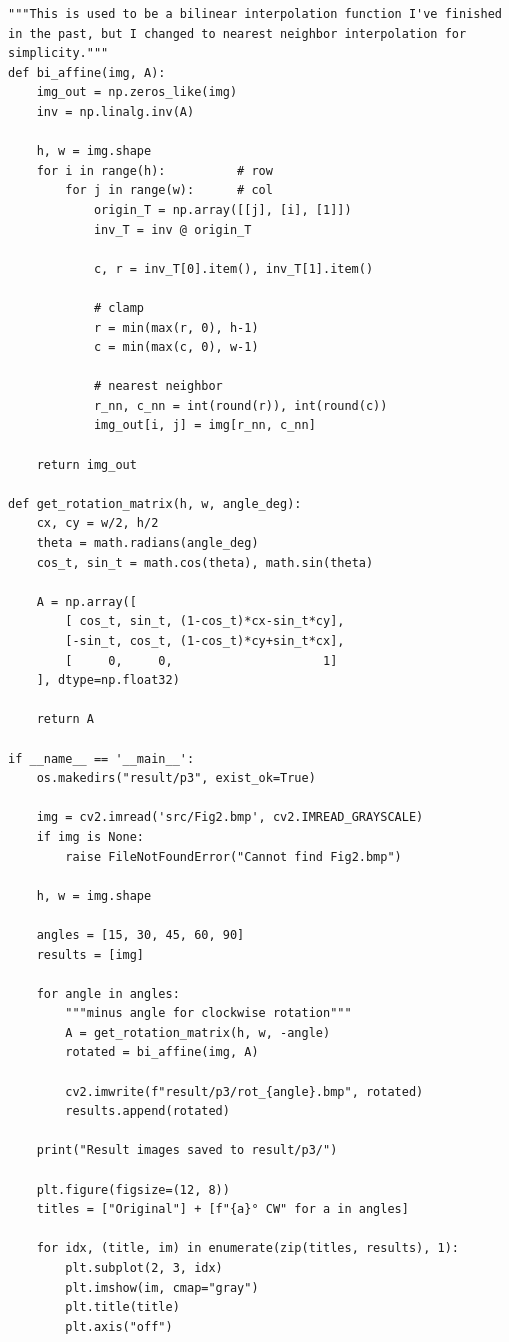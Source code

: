 \documentclass[12pt,a4paper]{article}
\begin{document}
\begin{enumerate}
\begin{verbatim}
"""This is used to be a bilinear interpolation function I've finished in the past, but I changed to nearest neighbor interpolation for simplicity."""
def bi_affine(img, A):
    img_out = np.zeros_like(img)
    inv = np.linalg.inv(A)

    h, w = img.shape
    for i in range(h):          # row
        for j in range(w):      # col
            origin_T = np.array([[j], [i], [1]])
            inv_T = inv @ origin_T

            c, r = inv_T[0].item(), inv_T[1].item()

            # clamp
            r = min(max(r, 0), h-1)
            c = min(max(c, 0), w-1)

            # nearest neighbor
            r_nn, c_nn = int(round(r)), int(round(c))
            img_out[i, j] = img[r_nn, c_nn]

    return img_out

def get_rotation_matrix(h, w, angle_deg):
    cx, cy = w/2, h/2
    theta = math.radians(angle_deg)
    cos_t, sin_t = math.cos(theta), math.sin(theta)

    A = np.array([
        [ cos_t, sin_t, (1-cos_t)*cx-sin_t*cy],
        [-sin_t, cos_t, (1-cos_t)*cy+sin_t*cx],
        [     0,     0,                     1]
    ], dtype=np.float32)

    return A

if __name__ == '__main__':
    os.makedirs("result/p3", exist_ok=True)

    img = cv2.imread('src/Fig2.bmp', cv2.IMREAD_GRAYSCALE)
    if img is None:
        raise FileNotFoundError("Cannot find Fig2.bmp")
    
    h, w = img.shape

    angles = [15, 30, 45, 60, 90]
    results = [img]

    for angle in angles:
        """minus angle for clockwise rotation"""
        A = get_rotation_matrix(h, w, -angle)
        rotated = bi_affine(img, A)

        cv2.imwrite(f"result/p3/rot_{angle}.bmp", rotated)
        results.append(rotated)

    print("Result images saved to result/p3/")

    plt.figure(figsize=(12, 8))
    titles = ["Original"] + [f"{a}° CW" for a in angles]

    for idx, (title, im) in enumerate(zip(titles, results), 1):
        plt.subplot(2, 3, idx)
        plt.imshow(im, cmap="gray")
        plt.title(title)
        plt.axis("off")


\end{verbatim}
\end{enumerate}
\end{document}
